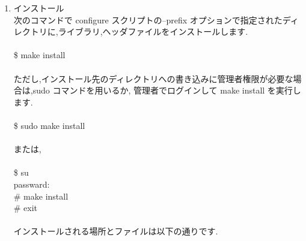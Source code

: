 \documentclass[twoside]{jbook}
\begin{document}
\begin{enumerate}
{\sf
\$ make clean\\
\$ make\\\\
}
また,configure スクリプトによる設定,Makefile の生成をやり直すには,make distclean を実行して,全ての情報を削除してから,configure スクリプトの実行からやり直します.\\\\
{\sf
\$ make distclean\\
\$ ./configure [option]\\
\$ make\\
}
\item インストール\\
次のコマンドで configure スクリプトの--prefix オプションで指定されたディレクトリに,ライブラリ,ヘッダファイルをインストールします.\\\\
{\sf
\$ make install\\\\
}
ただし,インストール先のディレクトリへの書き込みに管理者権限が必要な場合は,sudo コマンドを用いるか, 管理者でログインして make install を実行します.\\\\
{\sf
\$ sudo make install\\\\
}
または,\\\\
{\sf
\$ su\\
passward:\\
\# make install\\
\# exit\\\\
}
インストールされる場所とファイルは以下の通りです.\\


\end{enumerate}
\end{document}
